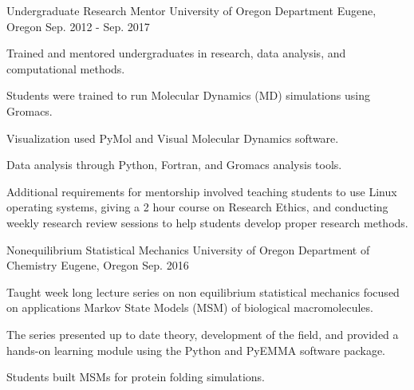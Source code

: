 

\begin{cventries}
  \cventry
    {Undergraduate Research Mentor}
    {University of Oregon Department}
    {Eugene, Oregon}
    {Sep. 2012 - Sep. 2017}
    {
      \begin{cvitems}
        \item{Trained and mentored undergraduates in research, data analysis, and computational methods.}
        \item{Students were trained to run Molecular Dynamics (MD) simulations using Gromacs.}
        \item{Visualization used PyMol and Visual Molecular Dynamics software.}
        \item{Data analysis through Python, Fortran, and Gromacs analysis tools.}
        \item{Additional requirements for mentorship involved teaching students to use Linux operating systems, giving a 2 hour course on Research Ethics, and conducting weekly research review sessions to help students develop proper research methods.}
      \end{cvitems}
    }

  \cventry
    {Nonequilibrium Statistical Mechanics}
    {University of Oregon Department of Chemistry}
    {Eugene, Oregon}
    {Sep. 2016}
    {
      \begin{cvitems}
        \item{Taught week long lecture series on non equilibrium statistical mechanics focused on applications Markov State Models (MSM) of biological macromolecules.}
        \item{The series presented up to date theory, development of the field, and provided a hands-on learning module using the Python and PyEMMA software package.}
        \item{Students built MSMs for protein folding simulations.}
      \end{cvitems}
    }


\end{cventries}
